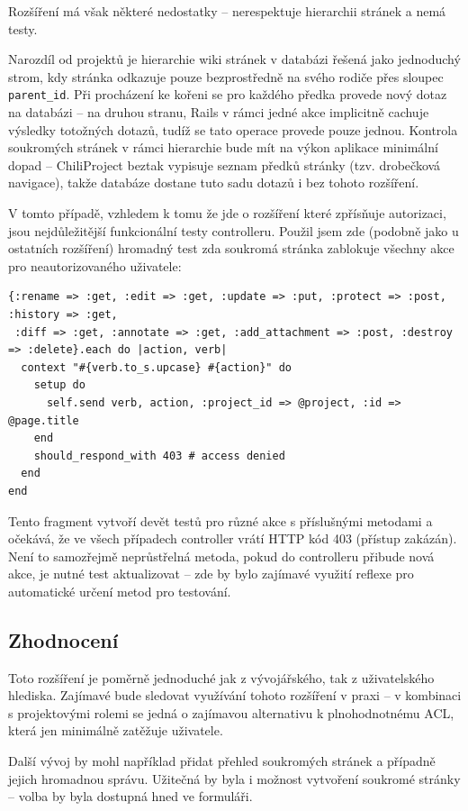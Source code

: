 \documentclass[thesis=B,czech]{FITthesis}[2012/05/02]
\begin{document}
Rozšíření má však některé nedostatky -- nerespektuje hierarchii stránek
a nemá testy.

Narozdíl od projektů je hierarchie wiki stránek v databázi řešená jako
jednoduchý strom, kdy stránka odkazuje pouze bezprostředně na svého
rodiče přes sloupec \lstinline!parent_id!. Při procházení ke kořeni se
pro každého předka provede nový dotaz na databázi -- na druhou stranu,
Rails v rámci jedné akce implicitně cachuje výsledky totožných dotazů,
tudíž se tato operace provede pouze jednou. Kontrola soukromých stránek
v rámci hierarchie bude mít na výkon aplikace minimální dopad --
ChiliProject beztak vypisuje seznam předků stránky (tzv. drobečková
navigace), takže databáze dostane tuto sadu dotazů i bez tohoto
rozšíření.

V tomto případě, vzhledem k tomu že jde o rozšíření které zpřísňuje
autorizaci, jsou nejdůležitější funkcionální testy controlleru. Použil
jsem zde (podobně jako u ostatních rozšíření) hromadný test zda soukromá
stránka zablokuje všechny akce pro neautorizovaného uživatele:

\begin{lstlisting}
{:rename => :get, :edit => :get, :update => :put, :protect => :post, :history => :get,
 :diff => :get, :annotate => :get, :add_attachment => :post, :destroy => :delete}.each do |action, verb|
  context "#{verb.to_s.upcase} #{action}" do
    setup do
      self.send verb, action, :project_id => @project, :id => @page.title
    end
    should_respond_with 403 # access denied
  end
end
\end{lstlisting}
Tento fragment vytvoří devět testů pro různé akce s příslušnými metodami
a očekává, že ve všech případech controller vrátí HTTP kód 403
(přístup zakázán). Není to samozřejmě neprůstřelná metoda, pokud do
controlleru přibude nová akce, je nutné test aktualizovat -- zde by bylo
zajímavé využití reflexe pro automatické určení metod pro testování.

\subsection{Zhodnocení}

Toto rozšíření je poměrně jednoduché jak z vývojářského, tak z
uživatelského hlediska. Zajímavé bude sledovat využívání tohoto
rozšíření v praxi -- v kombinaci s projektovými rolemi se jedná o
zajímavou alternativu k plnohodnotnému \gls{ACL}, která jen minimálně
zatěžuje uživatele.

Další vývoj by mohl například přidat přehled soukromých stránek a
případně jejich hromadnou správu. Užitečná by byla i možnost vytvoření
soukromé stránky -- volba by byla dostupná hned ve formuláři.
\end{document}

